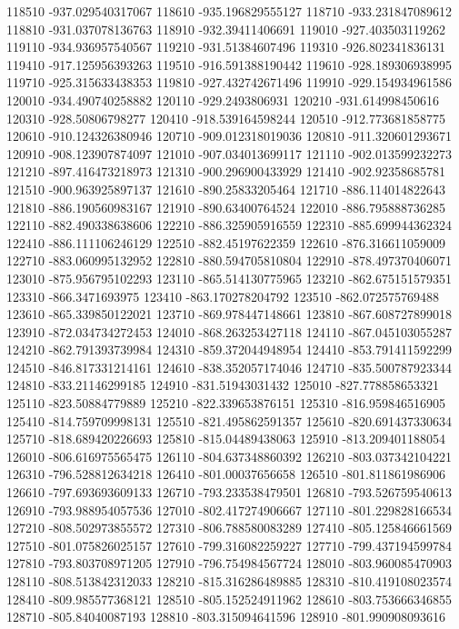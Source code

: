 {118510 -937.029540317067
118610 -935.196829555127
118710 -933.231847089612
118810 -931.037078136763
118910 -932.39411406691
119010 -927.403503119262
119110 -934.936957540567
119210 -931.51384607496
119310 -926.802341836131
119410 -917.125956393263
119510 -916.591388190442
119610 -928.189306938995
119710 -925.315633438353
119810 -927.432742671496
119910 -929.154934961586
120010 -934.490740258882
120110 -929.2493806931
120210 -931.614998450616
120310 -928.50806798277
120410 -918.539164598244
120510 -912.773681858775
120610 -910.124326380946
120710 -909.012318019036
120810 -911.320601293671
120910 -908.123907874097
121010 -907.034013699117
121110 -902.013599232273
121210 -897.416473218973
121310 -900.296900433929
121410 -902.92358685781
121510 -900.963925897137
121610 -890.25833205464
121710 -886.114014822643
121810 -886.190560983167
121910 -890.63400764524
122010 -886.795888736285
122110 -882.490338638606
122210 -886.325905916559
122310 -885.699944362324
122410 -886.111106246129
122510 -882.45197622359
122610 -876.316611059009
122710 -883.060995132952
122810 -880.594705810804
122910 -878.497370406071
123010 -875.956795102293
123110 -865.514130775965
123210 -862.675151579351
123310 -866.3471693975
123410 -863.170278204792
123510 -862.072575769488
123610 -865.339850122021
123710 -869.978447148661
123810 -867.608727899018
123910 -872.034734272453
124010 -868.263253427118
124110 -867.045103055287
124210 -862.791393739984
124310 -859.372044948954
124410 -853.791411592299
124510 -846.817331214161
124610 -838.352057174046
124710 -835.500787923344
124810 -833.21146299185
124910 -831.51943031432
125010 -827.778858653321
125110 -823.50884779889
125210 -822.339653876151
125310 -816.959846516905
125410 -814.759709998131
125510 -821.495862591357
125610 -820.691437330634
125710 -818.689420226693
125810 -815.04489438063
125910 -813.209401188054
126010 -806.616975565475
126110 -804.637348860392
126210 -803.037342104221
126310 -796.528812634218
126410 -801.00037656658
126510 -801.811861986906
126610 -797.693693609133
126710 -793.233538479501
126810 -793.526759540613
126910 -793.988954057536
127010 -802.417274906667
127110 -801.229828166534
127210 -808.502973855572
127310 -806.788580083289
127410 -805.125846661569
127510 -801.075826025157
127610 -799.316082259227
127710 -799.437194599784
127810 -793.803708971205
127910 -796.754984567724
128010 -803.960085470903
128110 -808.513842312033
128210 -815.316286489885
128310 -810.419108023574
128410 -809.985577368121
128510 -805.152524911962
128610 -803.753666346855
128710 -805.84040087193
128810 -803.315094641596
128910 -801.990908093616
}
